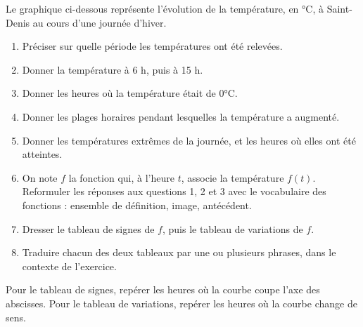 \documentclass[10pt,a4paper]{article}
\begin{document}
\begin{bloc}
\begin{exo}[Guidé]
Le graphique ci-dessous représente l'évolution de la température, en °C, à Saint-Denis au cours d'une journée d'hiver.

\begin{center}
\end{center}

\begin{enumerate}[leftmargin=*]
    \item Préciser sur quelle période les températures ont été relevées.
    \item Donner la température à 6 h, puis à 15 h.
    \item Donner les heures où la température était de \(0\)°C.
    \item Donner les plages horaires pendant lesquelles la température a augmenté.
    \item Donner les températures extrêmes de la journée, et les heures où elles ont été atteintes.
    \item On note \(f\) la fonction qui, à l'heure \(t\), associe la température \(f(t)\). Reformuler les réponses aux questions 1, 2 et 3 avec le vocabulaire des fonctions : ensemble de définition, image, antécédent.
    \item Dresser le tableau de signes de \(f\), puis le tableau de variations de \(f\).
    \item Traduire chacun des deux tableaux par une ou plusieurs phrases, dans le contexte de l'exercice.
\end{enumerate}

\begin{indication}
Pour le tableau de signes, repérer les heures où la courbe coupe l'axe des abscisses. Pour le tableau de variations, repérer les heures où la courbe change de sens.
\end{indication}

\end{exo}
\end{bloc}
\end{document}
